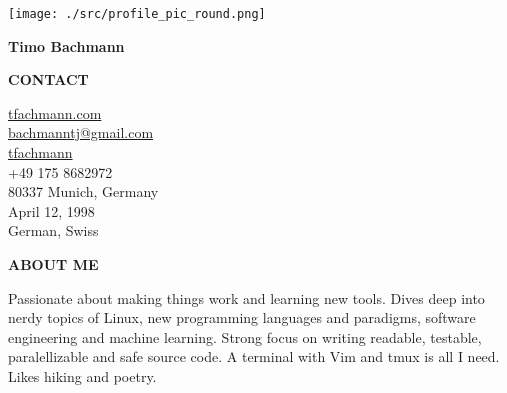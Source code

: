 \documentclass[a4paper, 10pt]{article}
\begin{document}
\thispagestyle{empty}

\begin{tcbraster}[raster columns=7]
\begin{tcolorbox}[left=4pt, right=4pt, top=4pt, height=1.0\textheight, colback=sidebar, boxrule=0.5pt, arc=8pt, frame empty, raster multicolumn=2, nobeforeafter]
    \texttt{[image: ./src/profile\_pic\_round.png]}
    \begin{center}
        {\large \textbf{Timo Bachmann}} \\
    \end{center}

    \vspace{6mm}
    \begin{center}
        {\textbf{CONTACT}} \\
    \end{center}
    \small
    \begin{spacing}{1.325}
        \hspace*{10pt} \href{https://tfachmann.com}{tfachmann.com} \\
        \hspace*{10pt} \href{mailto:bachmanntj@gmail.com}{bachmanntj@gmail.com} \\
        \hspace*{10pt} \href{https://github.com/tfachmann}{tfachmann} \\
        \hspace*{10pt} +49 175 8682972 \\
        \hspace*{10pt} 80337 Munich, Germany \\
        \hspace*{10pt} April 12, 1998 \\
        \hspace*{10pt} German, Swiss
    \end{spacing}
    \vspace{6mm}

    \begin{center}
        {\textbf{ABOUT ME}} \\
    \end{center}
    \begin{center}
        Passionate about making things work and learning new tools.
        Dives deep into nerdy topics of Linux, new programming languages and paradigms, software engineering and machine learning.
        Strong focus on writing readable, testable, paralellizable and safe source code.
        A terminal with Vim and tmux is all I need.
        Likes hiking and poetry.
    \end{center}


\end{tcolorbox}
\end{tcbraster}
\end{document}
